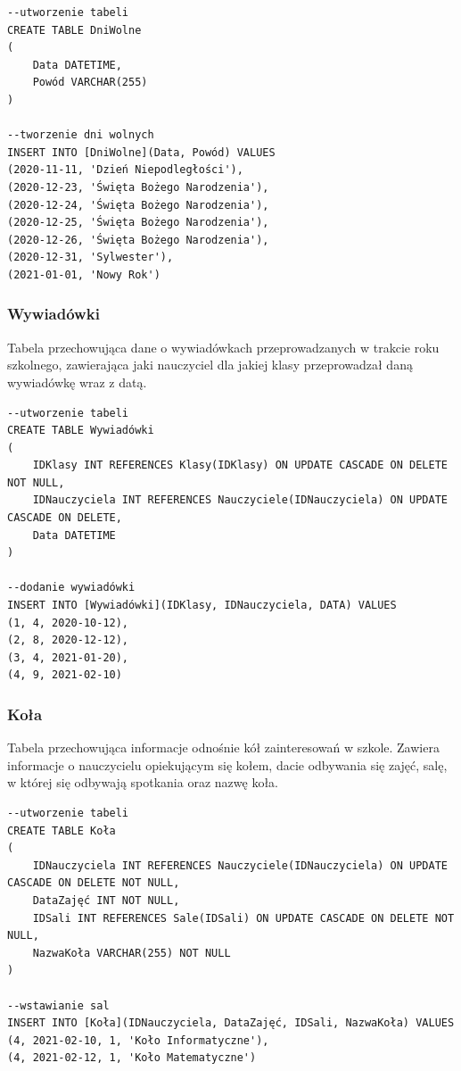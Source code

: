 \documentclass[60pt]{article}
\begin{document}
\begin{verbatim}
--utworzenie tabeli
CREATE TABLE DniWolne
(
	Data DATETIME,
	Powód VARCHAR(255)
)

--tworzenie dni wolnych
INSERT INTO [DniWolne](Data, Powód) VALUES
(2020-11-11, 'Dzień Niepodległości'),
(2020-12-23, 'Święta Bożego Narodzenia'),
(2020-12-24, 'Święta Bożego Narodzenia'),
(2020-12-25, 'Święta Bożego Narodzenia'),
(2020-12-26, 'Święta Bożego Narodzenia'),
(2020-12-31, 'Sylwester'),
(2021-01-01, 'Nowy Rok')
\end{verbatim}

 \subsubsection{Wywiadówki}
Tabela przechowująca dane o wywiadówkach przeprowadzanych w trakcie roku szkolnego, zawierająca jaki nauczyciel dla jakiej klasy przeprowadzał daną wywiadówkę wraz z datą.
 
\begin{verbatim}
--utworzenie tabeli
CREATE TABLE Wywiadówki
(
	IDKlasy INT REFERENCES Klasy(IDKlasy) ON UPDATE CASCADE ON DELETE NOT NULL,
	IDNauczyciela INT REFERENCES Nauczyciele(IDNauczyciela) ON UPDATE CASCADE ON DELETE,
	Data DATETIME
)

--dodanie wywiadówki
INSERT INTO [Wywiadówki](IDKlasy, IDNauczyciela, DATA) VALUES
(1, 4, 2020-10-12),
(2, 8, 2020-12-12),
(3, 4, 2021-01-20),
(4, 9, 2021-02-10)
\end{verbatim}

 \subsubsection{Koła}
Tabela przechowująca informacje odnośnie kół zainteresowań w szkole. Zawiera informacje o nauczycielu opiekującym się kołem, dacie odbywania się zajęć, salę, w której się odbywają spotkania oraz nazwę koła.
 
\begin{verbatim}
--utworzenie tabeli
CREATE TABLE Koła
(
	IDNauczyciela INT REFERENCES Nauczyciele(IDNauczyciela) ON UPDATE CASCADE ON DELETE NOT NULL,
	DataZajęć INT NOT NULL,
	IDSali INT REFERENCES Sale(IDSali) ON UPDATE CASCADE ON DELETE NOT NULL,
	NazwaKoła VARCHAR(255) NOT NULL
)

--wstawianie sal
INSERT INTO [Koła](IDNauczyciela, DataZajęć, IDSali, NazwaKoła) VALUES
(4, 2021-02-10, 1, 'Koło Informatyczne'),
(4, 2021-02-12, 1, 'Koło Matematyczne')
\end{verbatim}
\end{document}
